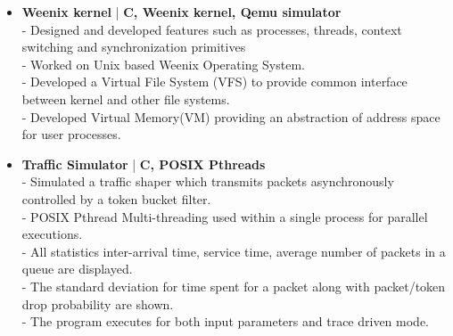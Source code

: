\begin{itemize}
  \item \textbf{Weenix kernel} | \textbf{C, Weenix kernel, Qemu simulator}\\
 - Designed and developed features such as processes, threads, context switching and synchronization primitives\\
 - Worked on Unix based Weenix Operating System.\\
 - Developed a Virtual File System (VFS) to provide common interface between kernel and other file systems. \\
 - Developed Virtual Memory(VM) providing an abstraction of address space for user processes.

 \item \textbf{Traffic Simulator} | \textbf{C, POSIX Pthreads}\\
 - Simulated a traffic shaper which transmits packets asynchronously controlled by a token bucket filter.\\
 - POSIX Pthread Multi-threading used within a single process for parallel executions.\\
 - All statistics inter-arrival time, service time, average number of packets in a queue are displayed.\\
 - The standard deviation for time spent for a packet along with packet/token drop probability are shown.\\
 - The program executes for both input parameters and trace driven mode. 
\end{itemize}
\vspace{5pt}
